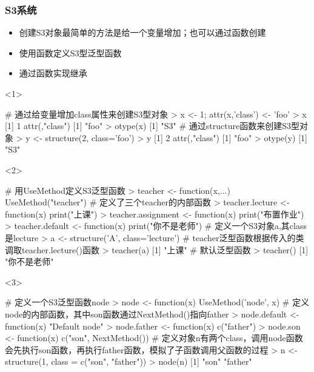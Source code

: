 \subsubsection{S3系统}
\begin{frame}[t,fragile]{\subsecname}{\subsubsecname}
  \begin{itemize}
  \item<1-> 创建S3对象最简单的方法是给一个变量增加；也可以通过函数创建
  \item<2-> 使用函数定义S3型泛型函数
  \item<3-> 通过函数实现继承
  \end{itemize}  

\begin{overlayarea}{\textwidth}{0.5\textheight}
\begin{onlyenv}<1>
\begin{rcode}
# 通过给变量增加class属性来创建S3型对象
> x <- 1; attr(x,'class') <- 'foo'
> x
[1] 1
attr(,"class")
[1] "foo"
> otype(x)
[1] "S3"
# 通过structure函数来创建S3型对象
> y <- structure(2, class='foo')
> y
[1] 2
attr(,"class")
[1] "foo"
> otype(y)
[1] "S3"
\end{rcode}  
\end{onlyenv}

\begin{onlyenv}<2>
\begin{rcode}
# 用UseMethod定义S3泛型函数
> teacher <- function(x,...) UseMethod("teacher")
# 定义了三个teacher的内部函数
> teacher.lecture <- function(x) print("上课")
> teacher.assignment <- function(x) print("布置作业")
> teacher.default <- function(x) print("你不是老师")
# 定义一个S3对象a,其class是lecture
> a <- structure('A', class='lecture')
# teacher泛型函数根据传入的类调取teacher.lecture()函数
> teacher(a) 
[1] "上课"
# 默认泛型函数
> teacher()
[1] "你不是老师"
\end{rcode}  
\end{onlyenv}

\begin{onlyenv}<3>
\begin{rcode}
# 定义一个S3泛型函数node
> node <- function(x) UseMethod('node', x)
# 定义node的内部函数，其中son函数通过NextMethod()指向father
> node.default <- function(x) "Default node"
> node.father <- function(x) c("father")
> node.son <- function(x) c("son", NextMethod())
# 定义对象n有两个class，调用node函数会先执行son函数，再执行father函数，模拟了子函数调用父函数的过程
> n <- structure(1, class = c("son", "father"))
> node(n)
[1] "son"    "father"
\end{rcode}
\end{onlyenv}


\end{overlayarea}
\end{frame}
